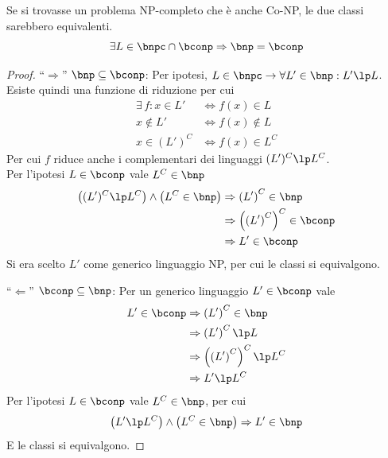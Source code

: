 \begin{theorem}
    \label{teo:npvsconp}
    Se si trovasse un problema NP-completo che è anche Co-NP, le due classi sarebbero equivalenti.
    \begin{equation*}
        \exists L \in \bnpc \cap \bconp
        \Rightarrow
        \bnp = \bconp
    \end{equation*}
    \begin{proof}
    ``$\Rightarrow$''
    $ \bnp \subseteq \bconp $:
    Per ipotesi, 
    $
    L \in \bnpc \to \forall L' \in \bnp : L' \lp L
    $.
    Esiste quindi una funzione di riduzione per cui
    \begin{align*}
        \exists \, f :
        x \in L'
        & \Leftrightarrow
        f(x) \in L
        \\
        x \notin L'
        & \Leftrightarrow
        f(x) \notin L
        \\
        x \in \left( L' \right)^C
        & \Leftrightarrow
        f(x) \in L^C
    \end{align*}
    Per cui $f$ riduce anche i complementari dei linguaggi
    $ ( L' )^C \lp L^C $.
    \\
    Per l'ipotesi 
    $L \in \bconp$
    vale
    $L^C \in \bnp$
    \begin{align*}
        \left( 
        ( L' )^C \lp L^C
        \right)
        \wedge
        \left( 
        L^C \in \bnp
        \right)
        & \Rightarrow
        \left( L' \right)^C \in \bnp
        \\
        & \Rightarrow
        \left( \left( L' \right)^C \right)^C \in \bconp
        \\
        & \Rightarrow
        L' \in \bconp
    \end{align*}
    Si era scelto $L'$ come generico linguaggio NP,
    per cui le classi si equivalgono.
    
    ``$\Leftarrow$''
    $ \bconp \subseteq \bnp $:
    Per un generico linguaggio $ L' \in \bconp $ vale
    \begin{align*}
        L' \in \bconp
        & \Rightarrow
        \left( L' \right)^C \in \bnp
        \\
        & \Rightarrow
        \left( L' \right)^C \lp L
        \\
        & \Rightarrow
        \left( \left( L' \right)^C \right)^C \lp L^C
        \\
        & \Rightarrow
        L' \lp L^C
    \end{align*}
    Per l'ipotesi 
    $L \in \bconp$
    vale
    $L^C \in \bnp$,
    per cui
    \begin{equation*}
        \left( 
            L' \lp L^C
        \right)
        \wedge
        \left( 
            L^C \in \bnp
        \right)
        \Rightarrow
        L' \in \bnp
    \end{equation*}
    E le classi si equivalgono.
    \end{proof}
\end{theorem}

